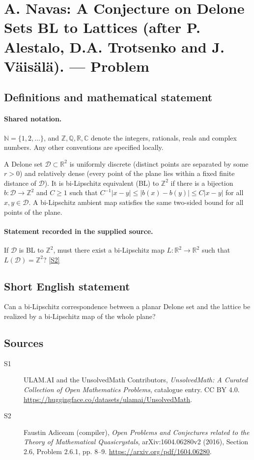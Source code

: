 \documentclass[11pt]{article}
\newcommand{\sref}[2]{\hyperlink{source:#1:#2}{[S#2]}}
\begin{document}
\section{A. Navas: A Conjecture on Delone Sets BL to Lattices (after P. Alestalo, D.A. Trotsenko and J. V\"ais\"al\"a). — Problem}\label{statement}

\subsection{Definitions and mathematical statement}

\paragraph{Shared notation.}$\mathbb N=\{1,2,\ldots\}$, and $\mathbb Z,\mathbb Q,\mathbb R,\mathbb C$ denote the integers, rationals, reals and complex numbers. Any other conventions are specified locally.


A Delone set $\mathcal D\subset\mathbb R^2$ is uniformly discrete (distinct points are separated by some $r>0$) and relatively dense (every point of the plane lies within a fixed finite distance of $\mathcal D$). It is bi-Lipschitz equivalent (BL) to $\mathbb Z^2$ if there is a bijection $b:\mathcal D\to\mathbb Z^2$ and $C\geq1$ such that $C^{-1}|x-y|\leq|b(x)-b(y)|\leq C|x-y|$ for all $x,y\in\mathcal D$. A bi-Lipschitz ambient map satisfies the same two-sided bound for all points of the plane.
\paragraph{Statement recorded in the supplied source.}
If $\mathcal D$ is BL to $\mathbb Z^2$, must there exist a bi-Lipschitz map $L:\mathbb R^2\to\mathbb R^2$ such that $L(\mathcal D)=\mathbb Z^2$? \sref{statement}{2}
\subsection{Short English statement}
Can a bi-Lipschitz correspondence between a planar Delone set and the lattice be realized by a bi-Lipschitz map of the whole plane?
\subsection{Sources}
\begin{description}
\item[\hypertarget{source:statement:1}{S1}] ULAM.AI and the UnsolvedMath Contributors, \emph{UnsolvedMath: A Curated Collection of Open Mathematics Problems}, catalogue entry. CC BY 4.0. \url{https://huggingface.co/datasets/ulamai/UnsolvedMath}.
\item[\hypertarget{source:statement:2}{S2}] Faustin Adiceam (compiler), \emph{Open Problems and Conjectures related to the Theory of Mathematical Quasicrystals}, arXiv:1604.06280v2 (2016), Section 2.6, Problem 2.6.1, pp. 8--9. \url{https://arxiv.org/pdf/1604.06280}.
\end{description}
\label{end:statement}
\end{document}
